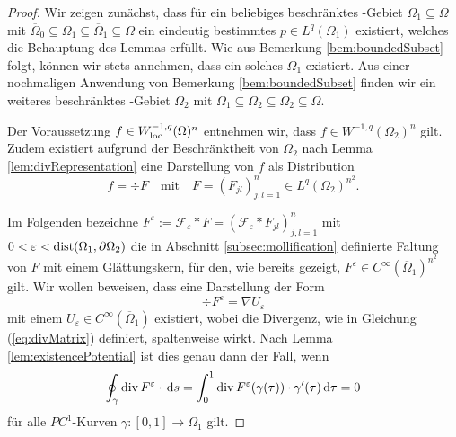 \begin{proof}
  Wir zeigen zunächst, dass für ein beliebiges beschränktes \lipschitz\hyp{}Gebiet $\Omega_1 \subseteq \Omega$ mit $\overline\Omega_0 \subseteq \Omega_1 \subseteq \overline\Omega_1 \subseteq \Omega$ ein eindeutig bestimmtes $p \in L^q(\Omega_1)$ existiert, welches die Behauptung des Lemmas erfüllt.
  Wie aus Bemerkung \ref{bem:boundedSubset} folgt, können wir stets annehmen, dass ein solches $\Omega_1$ existiert.
  Aus einer nochmaligen Anwendung von Bemerkung \ref{bem:boundedSubset} finden wir ein weiteres beschränktes \lipschitz\hyp{}Gebiet $\Omega_2$ mit $\overline\Omega_1 \subseteq \Omega_2 \subseteq \overline\Omega_2 \subseteq \Omega$.

  Der Voraussetzung $f \in W_{\operatorname{loc}}^{-1,q}(\Omega)^n$ entnehmen wir, dass $f \in W^{-1,q}(\Omega_2)^n$ gilt. Zudem existiert aufgrund der Beschränktheit von $\Omega_2$ nach Lemma \ref{lem:divRepresentation} eine Darstellung von $f$ als Distribution
  \begin{equation}
    \label{eq:divRepresentation}
    f = \div F \quad\text{mit}\quad F = (F_{jl})_{j,l=1}^n \in L^q(\Omega_2)^{n^2}.
  \end{equation}

  Im Folgenden bezeichne $F^\varepsilon := \mathcal{F}_\varepsilon \ast F = (\mathcal{F}_\varepsilon \ast F_{jl})_{j,l=1}^n$ mit $0 < \varepsilon < \operatorname{dist}(\Omega_1, \partial\Omega_2)$ die in Abschnitt \ref{subsec:mollification} definierte Faltung von $F$ mit einem Glättungskern, für den, wie bereits gezeigt, $F^\varepsilon \in C^\infty(\overline\Omega_1)^{n^2}$ gilt.
  Wir wollen beweisen, dass eine Darstellung der Form
  \begin{equation}
    \label{eq:divNabla}
    \div F^\varepsilon = \nabla U_\varepsilon
  \end{equation}
  mit einem $U_\varepsilon \in C^\infty(\overline\Omega_1)$ existiert, wobei die Divergenz, wie in Gleichung (\ref{eq:divMatrix}) definiert, spaltenweise wirkt.
  Nach Lemma \ref{lem:existencePotential} ist dies genau dann der Fall, wenn
  $$
  \oint_\gamma \mathrm{div\,} F^\varepsilon \cdot \, {\operatorname{d}\!{s}} = \int_0^1 \mathrm{div\,} F^\varepsilon(\gamma(\tau))\cdot \gamma'(\tau) \, {\operatorname{d}\!{\tau}} = 0
  $$
  für alle $PC^1$-Kurven $\gamma \colon [0,1] \to \overline\Omega_1$ gilt.


\end{proof}
